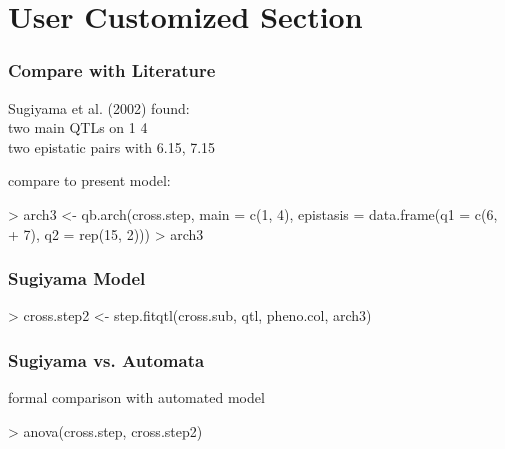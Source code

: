 


\section{User Customized Section}

\begin{frame}[fragile]
  \frametitle{Compare with Literature}

\tiny

Sugiyama et al. (2002) found:\\
two main QTLs on 1 4\\
two epistatic pairs with 6.15, 7.15

compare to present model:

\begin{Schunk}
\begin{Sinput}
> arch3 <- qb.arch(cross.step, main = c(1, 4), epistasis = data.frame(q1 = c(6, 
+     7), q2 = rep(15, 2)))
> arch3
\end{Sinput}
\end{Schunk}

\end{frame}

\begin{frame}[fragile]
  \frametitle{Sugiyama Model}

\tiny

\begin{Schunk}
\begin{Sinput}
> cross.step2 <- step.fitqtl(cross.sub, qtl, pheno.col, arch3)
\end{Sinput}
\end{Schunk}
\begin{Schunk}
\end{Schunk}
\end{frame}


\begin{frame}[fragile]
  \frametitle{Sugiyama vs. Automata}

formal comparison with automated model

\tiny

\begin{Schunk}
\begin{Sinput}
> anova(cross.step, cross.step2)
\end{Sinput}
\end{Schunk}

\end{frame}

